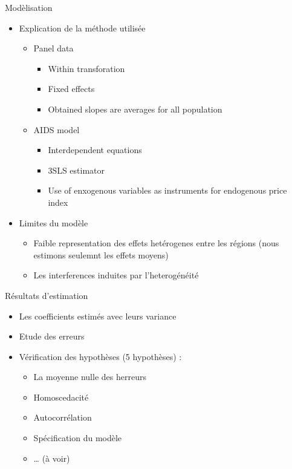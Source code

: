 \documentclass[11pt,ignorenonframetext,]{beamer}
\providecommand{\tightlist}{%
  \setlength{\itemsep}{0pt}\setlength{\parskip}{0pt}}
\begin{document}
\begin{frame}{Modèlisation}
\protect\hypertarget{modelisation}{}

\begin{itemize}
\tightlist
\item
  Explication de la méthode utilisée

  \begin{itemize}
  \tightlist
  \item
    Panel data

    \begin{itemize}
    \tightlist
    \item
      Within transforation
    \item
      Fixed effects
    \item
      Obtained slopes are averages for all population
    \end{itemize}
  \item
    AIDS model

    \begin{itemize}
    \tightlist
    \item
      Interdependent equations
    \item
      3SLS estimator
    \item
      Use of enxogenous variables as instruments for endogenous price
      index
    \end{itemize}
  \end{itemize}
\item
  Limites du modèle

  \begin{itemize}
  \tightlist
  \item
    Faible representation des effets hetérogenes entre les régions (nous
    estimons seulemnt les effets moyens)
  \item
    Les interferences induites par l'heterogénéité
  \end{itemize}
\end{itemize}

\end{frame}

\begin{frame}{Résultats d'estimation}
\protect\hypertarget{resultats-destimation}{}

\begin{itemize}
\tightlist
\item
  Les coefficients estimés avec leurs variance
\item
  Etude des erreurs
\item
  Vérification des hypothèses (5 hypothèses) :

  \begin{itemize}
  \tightlist
  \item
    La moyenne nulle des herreurs
  \item
    Homoscedacité
  \item
    Autocorrélation
  \item
    Spécification du modèle
  \item
    \ldots{} (à voir)
  \end{itemize}
\end{itemize}

\end{frame}
\end{document}
